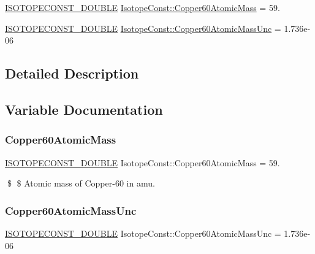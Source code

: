 \begin{DoxyCompactItemize}
\item 
\mbox{\hyperlink{group___isotope_const-_macros_ga8f45a7272ce02c0b4c65c44636ed719a}{I\+S\+O\+T\+O\+P\+E\+C\+O\+N\+S\+T\+\_\+\+D\+O\+U\+B\+LE}} \mbox{\hyperlink{group___isotope_const-_copper-_cu60_ga66e3d7842ac8011cefbab48e033391f6}{Isotope\+Const\+::\+Copper60\+Atomic\+Mass}} = 59.
\item 
\mbox{\hyperlink{group___isotope_const-_macros_ga8f45a7272ce02c0b4c65c44636ed719a}{I\+S\+O\+T\+O\+P\+E\+C\+O\+N\+S\+T\+\_\+\+D\+O\+U\+B\+LE}} \mbox{\hyperlink{group___isotope_const-_copper-_cu60_ga6db98f44102be990a12aea3b3080a0a6}{Isotope\+Const\+::\+Copper60\+Atomic\+Mass\+Unc}} = 1.\+736e-\/06
\end{DoxyCompactItemize}


\subsection{Detailed Description}


\subsection{Variable Documentation}
\mbox{\label{group___isotope_const-_copper-_cu60_ga66e3d7842ac8011cefbab48e033391f6}} 
\subsubsection{\texorpdfstring{Copper60\+Atomic\+Mass}{Copper60AtomicMass}}
{\footnotesize\ttfamily \mbox{\hyperlink{group___isotope_const-_macros_ga8f45a7272ce02c0b4c65c44636ed719a}{I\+S\+O\+T\+O\+P\+E\+C\+O\+N\+S\+T\+\_\+\+D\+O\+U\+B\+LE}} Isotope\+Const\+::\+Copper60\+Atomic\+Mass = 59.}

\$ \$ Atomic mass of Copper-\/60 in amu. \mbox{\label{group___isotope_const-_copper-_cu60_ga6db98f44102be990a12aea3b3080a0a6}} 
\subsubsection{\texorpdfstring{Copper60\+Atomic\+Mass\+Unc}{Copper60AtomicMassUnc}}
{\footnotesize\ttfamily \mbox{\hyperlink{group___isotope_const-_macros_ga8f45a7272ce02c0b4c65c44636ed719a}{I\+S\+O\+T\+O\+P\+E\+C\+O\+N\+S\+T\+\_\+\+D\+O\+U\+B\+LE}} Isotope\+Const\+::\+Copper60\+Atomic\+Mass\+Unc = 1.\+736e-\/06}

